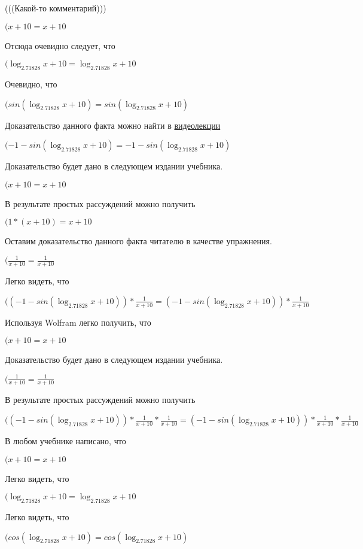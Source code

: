 \documentclass[12pt,a4paper,fleqn]{article}
\theoremstyle{definition}
\begin{document}
(((Какой-то комментарий)))

$( x  +  10  =  x  +  10 $

Отсюда очевидно следует, что

$(\log_{ 2.71828 }{ x  +  10 } = \log_{ 2.71828 }{ x  +  10 }$

Очевидно, что

$(sin(\log_{ 2.71828 }{ x  +  10 }) = sin(\log_{ 2.71828 }{ x  +  10 })$

Доказательство данного факта можно найти в \href{https://www.youtube.com/watch?v=dQw4w9WgXcQ}{видеолекции}

$( -1  - sin(\log_{ 2.71828 }{ x  +  10 }) =  -1  - sin(\log_{ 2.71828 }{ x  +  10 })$

Доказательство будет дано в следующем издании учебника.

$( x  +  10  =  x  +  10 $

В результате простых рассуждений можно получить

$( 1  * ( x  +  10 ) =  x  +  10 $

Оставим доказательство данного факта читателю в качестве упражнения.

$(\frac{ 1 }{ x  +  10 }
 = \frac{ 1 }{ x  +  10 }
$

Легко видеть, что

$(( -1  - sin(\log_{ 2.71828 }{ x  +  10 })) * \frac{ 1 }{ x  +  10 }
 = ( -1  - sin(\log_{ 2.71828 }{ x  +  10 })) * \frac{ 1 }{ x  +  10 }
$

Используя Wolfram легко получить, что

$( x  +  10  =  x  +  10 $

Доказательство будет дано в следующем издании учебника.

$(\frac{ 1 }{ x  +  10 }
 = \frac{ 1 }{ x  +  10 }
$

В результате простых рассуждений можно получить

$(( -1  - sin(\log_{ 2.71828 }{ x  +  10 })) * \frac{ 1 }{ x  +  10 }
 * \frac{ 1 }{ x  +  10 }
 = ( -1  - sin(\log_{ 2.71828 }{ x  +  10 })) * \frac{ 1 }{ x  +  10 }
 * \frac{ 1 }{ x  +  10 }
$

В любом учебнике написано, что

$( x  +  10  =  x  +  10 $

Легко видеть, что

$(\log_{ 2.71828 }{ x  +  10 } = \log_{ 2.71828 }{ x  +  10 }$

Легко видеть, что

$(cos(\log_{ 2.71828 }{ x  +  10 }) = cos(\log_{ 2.71828 }{ x  +  10 })$
\end{document}
